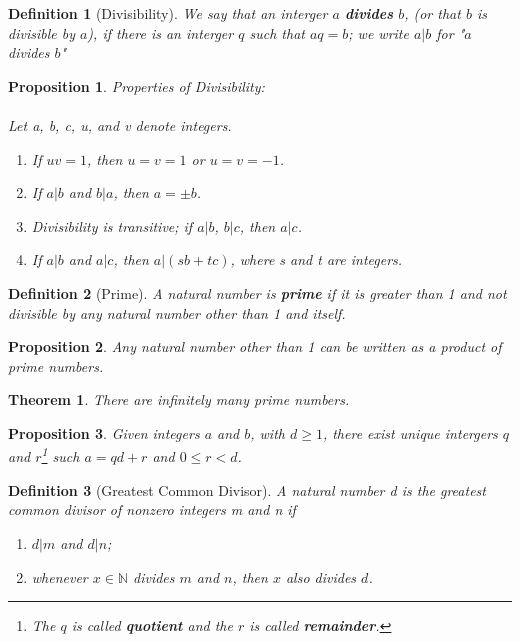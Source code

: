 \documentclass[12pt]{article}
\newtheorem{definition}{Definition}[subsection]
\newtheorem{theorem}{Theorem}[subsection]
\newtheorem{proposition}{Proposition}[subsection]
\begin{document}
    \begin{definition}[Divisibility]
        We say that an interger $a$ \textbf{divides} $b$, (or that $b$ is divisible by $a$), if there is an interger $q$ such that $aq = b$; we write $a|b$ for "$a$ divides $b$"
    \end{definition}

    \begin{proposition}
        Properties of Divisibility:\\\\
        Let a, b, c, u, and v denote integers.\\
        \begin{enumerate}
            \item If $uv = 1$, then $u = v = 1$ or $u = v = -1$.
            \item If $a|b$ and $b|a$, then $a = \pm b$.
            \item Divisibility is transitive; if $a|b$, $b|c$, then $a|c$.
            \item If $a|b$ and $a|c$, then $a | (sb+tc)$, where s and t are integers.
        \end{enumerate}

    \end{proposition}
    \begin{definition}[Prime]
        A natural number is \textbf{prime} if it is greater than 1 and not divisible by any natural number other than 1 and itself.
    \end{definition}
    \begin{proposition}
        Any natural number other than 1 can be written as a product of prime numbers.
    \end{proposition}
    \begin{theorem}
        There are infinitely many prime numbers.
    \end{theorem}
    \begin{proposition}
        Given integers $a$ and $b$, with $d \geq 1$, there exist unique intergers $q$ and $r$\footnote{The $q$ is called \textbf{quotient} and the $r$ is called \textbf{remainder}.} such $a = qd + r$ and $0 \leq r < d$.
    \end{proposition}
    \begin{definition}[Greatest Common Divisor]
        A natural number d is the greatest common divisor of nonzero integers m and n if\\
        \begin{enumerate}
            \item $d | m$ and $d | n$;
            \item whenever $x \in \mathbb{N}$ divides $m$ and $n$, then $x$ also divides $d$.
        \end{enumerate}
    \end{definition}
\end{document}
